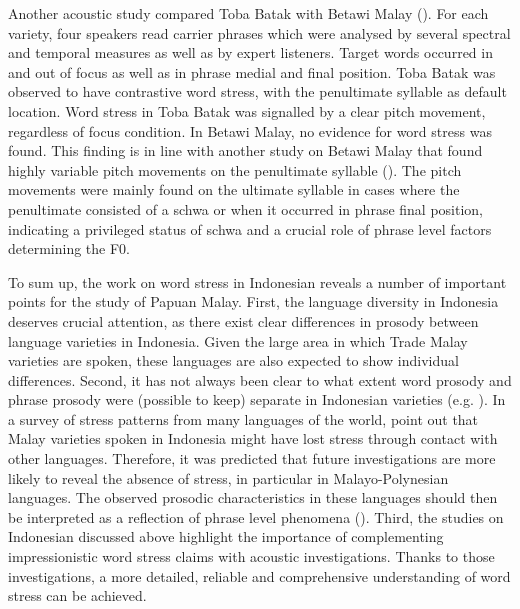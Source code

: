 Another acoustic study compared Toba Batak with Betawi Malay (\citealt{roosman_melodic_2007}). For each variety, four speakers read carrier phrases which were analysed by several spectral and temporal measures as well as by expert listeners. Target words occurred in and out of focus as well as in phrase medial and final position. Toba Batak was observed to have contrastive word stress, with the penultimate syllable as default location. Word stress in Toba Batak was signalled by a clear pitch movement, regardless of focus condition. In Betawi Malay, no evidence for word stress was found. This finding is in line with another study on Betawi Malay that found highly variable pitch movements on the penultimate syllable (\citealt{vanheuven_betawi_2008}). The pitch movements were mainly found on the ultimate syllable in cases where the penultimate consisted of a schwa or when it occurred in phrase final position, indicating a privileged status of schwa and a crucial role of phrase level factors determining the F0.\par

To sum up, the work on word stress in Indonesian reveals a number of important points for the study of Papuan Malay. First, the language diversity in Indonesia deserves crucial attention, as there exist clear differences in prosody between language varieties in Indonesia. Given the large area in which Trade Malay varieties are spoken, these languages are also expected to show individual differences. Second, it has not always been clear to what extent word prosody and phrase prosody were (possible to keep) separate in Indonesian varieties (e.g. \citealt{vanheuven_betawi_2008}). In a survey of stress patterns from many languages of the world, \citet{goedemans_no_2014} point out that Malay varieties spoken in Indonesia might have lost stress through contact with other languages. Therefore, it was predicted that future investigations are more likely to reveal the absence of stress, in particular in Malayo-Polynesian languages. The observed prosodic characteristics in these languages should then be interpreted as a reflection of phrase level phenomena (\citealt{goedemans_no_2014}). Third, the studies on Indonesian discussed above highlight the importance of complementing impressionistic word stress claims with acoustic investigations. Thanks to those investigations, a more detailed, reliable and comprehensive understanding of word stress can be achieved.

